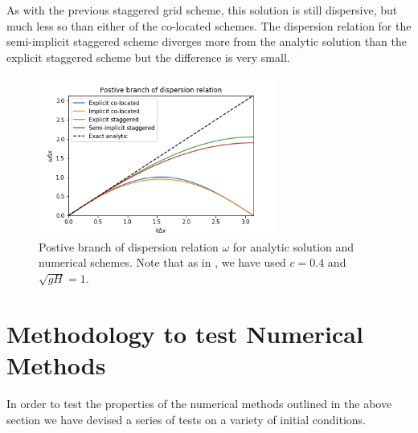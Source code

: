 \documentclass[a4paper,12pt, notitlepage]{article}
\begin{document}
As with the previous staggered grid scheme, this solution is still dispersive, but much less so than either of the co-located schemes. The dispersion relation for the semi-implicit staggered scheme diverges more from the analytic solution than the explicit staggered scheme but the difference is very small. 

\begin{figure}
	\centering
	\includegraphics[width=0.7\textwidth]{dispersion_relations.png}
	\caption{Postive branch of dispersion relation $\omega$ for analytic solution and numerical schemes. Note that as in \cite{MPE textbook}, we have used $c=0.4$ and $\sqrt{gH} = 1$.} \label{dispersionfigure}
\end{figure}

\section{Methodology to test Numerical Methods}
In order to test the properties of the numerical methods outlined in the above section we have devised a series of tests on a variety of initial conditions.
\end{document}
